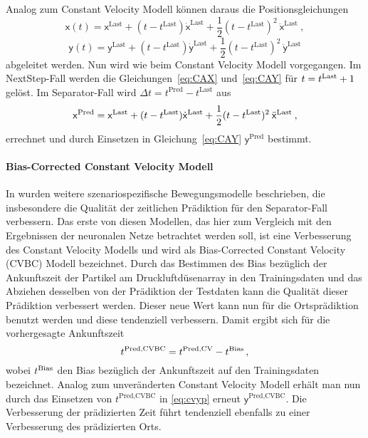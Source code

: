 Analog zum Constant Velocity Modell können daraus die Positionsgleichungen 
% 
\begin{equation} 
    \mathsf{x}(t) = \mathsf{x}^{\text{Last}} + (t - t^{\text{Last}})\dot{\mathsf{x}}^{\text{Last}} + \frac{1}{2} (t - t^{\text{Last}})^2 \: \ddot{\mathsf{x}}^{\text{Last}} \: , \label{eq:CAX}
\end{equation}
\begin{equation} 
    \mathsf{y}(t) = \mathsf{y}^{\text{Last}} + (t - t^{\text{Last}})\dot{\mathsf{y}}^{\text{Last}}
    + \frac{1}{2} (t - t^{\text{Last}})^2 \: \ddot{\mathsf{y}}^{\text{Last}} \label{eq:CAY}
\end{equation}
% 
abgeleitet werden.
Nun wird wie beim Constant Velocity Modell vorgegangen.
Im NextStep-Fall werden die Gleichungen~\eqref{eq:CAX} und~\eqref{eq:CAY} für \(t = t{^{\text{Last}}} + 1\) gelöst.
Im Separator-Fall wird \(\Delta t = t^{\text{Pred}} - t^{\text{Last}} \) aus
\begin{equation*} 
    \mathsf{x}{^{\text{Pred}}} = \mathsf{x}^{\text{Last}} + (t - t^{\text{Last}})\dot{\mathsf{x}}^{\text{Last}} 
    + \frac{1}{2} (t - t^{\text{Last}})^2 \: \ddot{\mathsf{x}}^{\text{Last}} \: , \label{eq:CAX2}
\end{equation*}
errechnet und durch Einsetzen in Gleichung~\eqref{eq:CAY} \(\mathsf{y}^{\text{Pred}}\) bestimmt.


\paragraph{Bias-Corrected Constant Velocity Modell}

In \cite{Pfaff2018} wurden weitere szenariospezifische Bewegungsmodelle beschrieben, die insbesondere die Qualität der zeitlichen Prädiktion für den Separator-Fall verbessern.
Das erste von diesen Modellen, das hier zum Vergleich mit den Ergebnissen der neuronalen Netze betrachtet werden soll, ist eine Verbesserung des Constant Velocity Modells und wird als Bias-Corrected Constant Velocity (CVBC) Modell bezeichnet.
Durch das Bestimmen des Bias bezüglich der Ankunftszeit der Partikel am Druckluftdüsenarray in den Trainingsdaten und das Abziehen desselben von der Prädiktion der Testdaten kann die Qualität dieser Prädiktion verbessert werden.
Dieser neue Wert kann nun für die Ortsprädiktion benutzt werden und diese tendenziell verbessern.
Damit ergibt sich für die vorhergesagte Ankunftszeit
% 
\begin{equation*}
    t{^{\text{Pred,CVBC}}} = t{^{\text{Pred,CV}}} - t{^{\text{Bias}}} \, ,
\end{equation*}
% 
wobei \(t{^{\text{Bias}}}\) den Bias bezüglich der Ankunftszeit auf den Trainingsdaten bezeichnet.
Analog zum unveränderten Constant Velocity Modell erhält man nun durch das Einsetzen von \(t^{\text{Pred,CVBC}}\) in \eqref{eq:cvyp} erneut \(\mathsf{y}^{\text{Pred,CVBC}}\).
Die Verbesserung der prädizierten Zeit führt tendenziell ebenfalls zu einer Verbesserung des prädizierten Orts.


